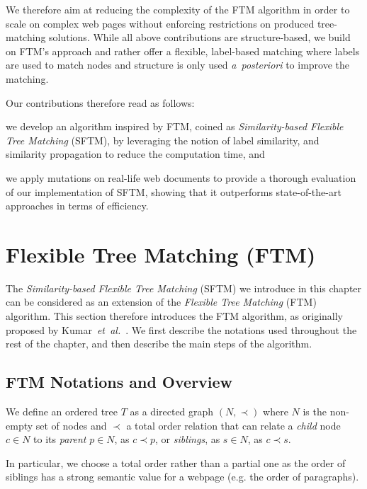 We therefore aim at reducing the complexity of the FTM algorithm in order to scale on complex web pages without enforcing restrictions on produced tree-matching solutions.
While all above contributions are structure-based, we build on FTM's approach and rather offer a flexible, label-based matching where labels are used to match nodes and structure is only used \emph{a~posteriori} to improve the matching.

Our contributions therefore read as follows:
\begin{compactenum}
    \item we develop an algorithm inspired by FTM, coined as \emph{Similarity-based Flexible Tree Matching} (SFTM), by leveraging the notion of label similarity, and similarity propagation to reduce the computation time, and
    \item we apply mutations on real-life web documents to provide a thorough evaluation of our implementation of SFTM, showing that it outperforms state-of-the-art approaches in terms of efficiency.
\end{compactenum}

\section{Flexible Tree Matching (FTM)}\label{sec:ftm}
The \emph{Similarity-based Flexible Tree Matching} (SFTM) we introduce in this chapter can be considered as an extension of the \textit{Flexible Tree Matching} (FTM) algorithm.
This section therefore introduces the FTM algorithm, as originally proposed by Kumar~\emph{et~al.}~\cite{Kumar2011_Bricolage}.
We first describe the notations used throughout the rest of the chapter, and then describe the main steps of the algorithm.

\subsection{FTM Notations and Overview}
We define an ordered tree $T$ as a directed graph $(N,\prec)$ where $N$ is the non-empty set of nodes and $\prec$ a total order relation that can relate a \emph{child} node $c \in N$ to its \emph{parent} $p \in N$, as $c \prec p$, or \emph{siblings}, as $s \in N$, as $c \prec s$.

In particular, we choose a total order rather than a partial one as the order of siblings has a strong semantic value for a webpage (e.g. the order of paragraphs).

